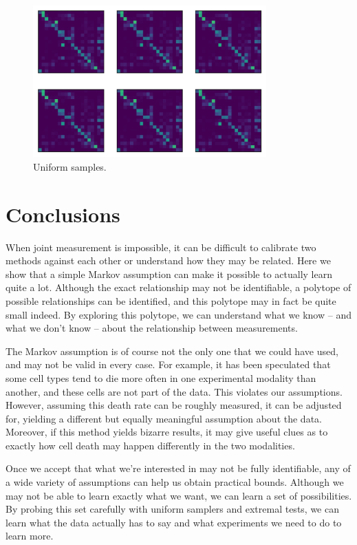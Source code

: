 \begin{figure}
\includegraphics[width=0.8\textwidth]{../images/rux}
\caption{Uniform samples.\label{fig:uniformsamples}}
\end{figure}

\section{Conclusions}

When joint measurement is impossible, it can be difficult to calibrate two methods against each other or understand how they may be related.  Here we show that a simple Markov assumption can make it possible to actually learn quite a lot.  Although the exact relationship may not be identifiable, a polytope of possible relationships can be identified, and this polytope may in fact be quite small indeed.  By exploring this polytope, we can understand what we know -- and what we don't know -- about the relationship between measurements.

The Markov assumption is of course not the only one that we could have used, and may not be valid in every case.  For example, it has been speculated that some cell types tend to die more often in one experimental modality than another, and these cells are not part of the data.  This violates our assumptions.  However, assuming this death rate can be roughly measured, it can be adjusted for, yielding a different but equally meaningful assumption about the data.  Moreover, if this method yields bizarre results, it may give useful clues as to exactly how cell death may happen differently in the two modalities.

Once we accept that what we're interested in may not be fully identifiable, any of a wide variety of assumptions can help us obtain practical bounds.  Although we may not be able to learn exactly what we want, we can learn a set of possibilities.  By probing this set carefully with uniform samplers and extremal tests, we can learn what the data actually has to say and what experiments we need to do to learn more.  

